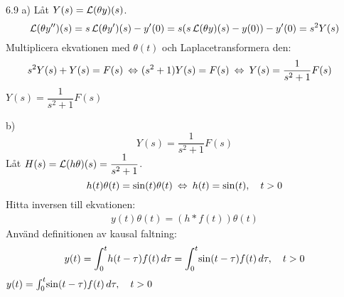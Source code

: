 \begin{task}{6.9 a)}
	Låt $Y(s)=\operatorname{\mathcal{L}}(\theta y)(s)$.
	\[\operatorname{\mathcal{L}}(\theta y'')(s)=s\operatorname{\mathcal{L}}(\theta y')(s)-y'(0)=s(s\operatorname{\mathcal{L}}(\theta y)(s)-y(0))-y'(0)=s^2Y(s)\]
	Multiplicera ekvationen med $\theta(t)$ och Laplacetransformera den:
	\begin{align*}
	&s^2Y(s)+Y(s)=F(s) \lra
	(s^2+1)Y(s)=F(s) \lra
	Y(s)=\frac{1}{s^2+1}F(s)
	\end{align*}
	\ans $Y(s)=\dfrac{1}{s^2+1}F(s)$
\end{task}


\begin{task}{b)}
	\[Y(s)=\frac{1}{s^2+1}F(s)\]
	Låt $H(s)=\operatorname{\mathcal{L}} (h\theta)(s)=\dfrac{1}{s^2+1}$.
	\[h(t)\theta(t)=\sin(t)\theta(t) \lra h(t)=\sin(t)\cond{t > 0}\]
	Hitta inversen till ekvationen:
	\begin{align*}
	y(t)\theta(t)=(h*f(t))\theta(t)
	\end{align*}
	Använd definitionen av kausal faltning:
	\begin{align*}
	y(t)=
	\int_{0}^{t}\!h(t-\tau)f(t)\, d\tau=
	\int_{0}^{t}\!\sin(t-\tau)f(t)\, d\tau, \quad t>0
	\end{align*}
	\ans $y(t)=\int_{0}^{t}\!\sin(t-\tau)f(t)\, d\tau, \quad t>0$
\end{task}

